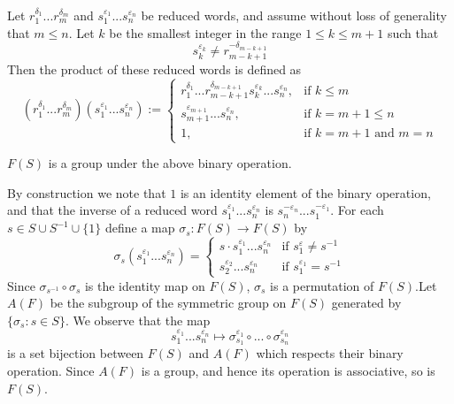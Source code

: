 \documentclass[12pt, a4paper, twoside, openright, titlepage]{book}
\begin{document}
\begin{cons}{}{}
         Let $r_1^{\delta_1}...r_m^{\delta_m}$ and $s_1^{\varepsilon_1}...s_n^{\varepsilon_n}$ be reduced words, and assume without loss of generality that $m \leq n$. Let $k$ be the smallest integer in the range $1 \leq k \leq m+1$ such that \begin{equation}
                s_k^{\varepsilon_k} \neq r_{m-k+1}^{-\delta_{m-k+1}}
        \end{equation}
        Then the product of these reduced words is defined as \begin{equation}
                (r_1^{\delta_1}...r_m^{\delta_m})(s_1^{\varepsilon_1}...s_n^{\varepsilon_n}) := \left\{\begin{array}{ll}
                        r_1^{\delta_1}...r_{m-k+1}^{\delta_{m-k+1}}s_k^{\varepsilon_k}...s_n^{\varepsilon_n}, & \text{if $k \leq m$} \\
                        s_{m+1}^{\varepsilon_{m+1}}...s_n^{\varepsilon_n}, & \text{if $k = m+1\leq n$} \\
                        1, & \text{if $k = m+1$ and $m = n$}
                \end{array}\right.
        \end{equation}
\end{cons}


\begin{thm}{}{}
        $F(S)$ is a group under the above binary operation.
\end{thm}
\begin{proof*}{}{}
        By construction we note that $1$ is an identity element of the binary operation, and that the inverse of a reduced word $s_1^{\varepsilon_1}...s_n^{\varepsilon_n}$ is $s_n^{-\varepsilon_n}...s_1^{-\varepsilon_1}$. For each $s \in S\cup S^{-1} \cup\{1\}$ define a map $\sigma_s:F(S)\rightarrow F(S)$ by \begin{equation}
                \sigma_s(s_1^{\varepsilon_1}...s_n^{\varepsilon_n}) = \left\{\begin{array}{ll} 
                        s\cdot s_1^{\varepsilon_1}...s_n^{\varepsilon_n} & \text{if $s_1^{\varepsilon} \neq s^{-1}$} \\
                        s_2^{\varepsilon_2}...s_n^{\varepsilon_n} & \text{if $s_1^{\varepsilon_1} = s^{-1}$}
                \end{array}\right.
        \end{equation}
        Since $\sigma_{s^{-1}}\circ \sigma_s$ is the identity map on $F(S)$, $\sigma_s$ is a permutation of $F(S)$.Let $A(F)$ be the subgroup of the symmetric group on $F(S)$ generated by $\{\sigma_s:s\in S\}$. We observe that the map \begin{equation}
                s_1^{\varepsilon_1}...s_n^{\varepsilon_n} \mapsto \sigma_{s_1}^{\varepsilon_1}\circ ... \circ \sigma_{s_n}^{\varepsilon_n}
        \end{equation}
        is a set bijection between $F(S)$ and $A(F)$ which respects their binary operation. Since $A(F)$ is a group, and hence its operation is associative, so is $F(S)$.
\end{proof*}
\end{document}
